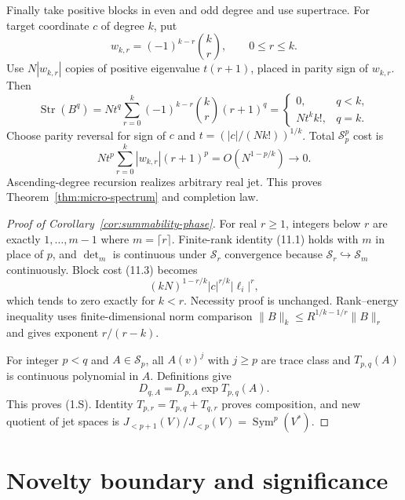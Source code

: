 \documentclass[11pt]{article}
\theoremstyle{definition}
\theoremstyle{remark}
\newcommand{\norm}[1]{\lVert #1\rVert}
\begin{document}
Finally take positive blocks in even and odd degree and use supertrace.  For target coordinate
$c$ of degree $k$, put
\[
 w_{k,r}=(-1)^{k-r}\binom kr,\qquad 0\leq r\leq k.
\]
Use $N|w_{k,r}|$ copies of positive eigenvalue $t(r+1)$, placed in parity sign of $w_{k,r}$.
Then
\[
 \operatorname{Str}(B^q)=Nt^q
 \sum_{r=0}^k(-1)^{k-r}\binom kr(r+1)^q
 =
 \begin{cases}0,&q<k,\\Nt^kk!,&q=k.\end{cases}
\]
Choose parity reversal for sign of $c$ and
$t=(|c|/(Nk!))^{1/k}$.  Total $\mathcal S_p^p$ cost is
\[
 Nt^p\sum_{r=0}^k|w_{k,r}|(r+1)^p=O(N^{1-p/k})\longrightarrow0.
\]
Ascending-degree recursion realizes arbitrary real jet.  This proves
Theorem~\ref{thm:micro-spectrum} and completion law.

\begin{proof}[Proof of Corollary~\ref{cor:summability-phase}]
For real $r\geq1$, integers below $r$ are exactly $1,\ldots,m-1$ where $m=\lceil r\rceil$.
Finite-rank identity (11.1) holds with $m$ in place of $p$, and $\det_m$ is continuous under
$\mathcal S_r$ convergence because $\mathcal S_r\hookrightarrow\mathcal S_m$ continuously.
Block cost (11.3) becomes
\[
 (kN)^{1-r/k}|c|^{r/k}|\ell_i|^r,
\]
which tends to zero exactly for $k<r$.  Necessity proof is unchanged.  Rank--energy inequality
uses finite-dimensional norm comparison
$\norm B_k\leq R^{1/k-1/r}\norm B_r$ and gives exponent $r/(r-k)$.

For integer $p<q$ and $A\in\mathcal S_p$, all $A(v)^j$ with $j\geq p$ are trace class and
$T_{p,q}(A)$ is continuous polynomial in $A$.  Definitions give
\[
 D_{q,A}=D_{p,A}\exp T_{p,q}(A).
\]
This proves (1.S).  Identity
$T_{p,r}=T_{p,q}+T_{q,r}$ proves composition, and new quotient of jet spaces is
$J_{<p+1}(V)/J_{<p}(V)=\operatorname{Sym}^p(V^*)$.
\end{proof}

\section{Novelty boundary and significance}
\label{sec:boundary}
\end{document}
